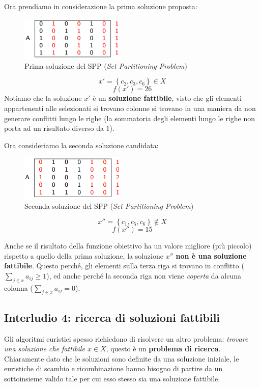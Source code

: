 \documentclass{article}
\begin{document}
Ora prendiamo in considerazione la prima soluzione proposta:

\begin{figure}[H]
    \centering
    \includegraphics[width=5cm]{images/SPP2_fst_sol.png}
    \caption{Prima soluzione del SPP (\textit{Set Partitioning Problem})}
    \label{fig:fst_sol_SPP2}
\end{figure}

$$x'=\left\{c_2,c_3,c_6\right\}\in X$$
$$f(x')=26$$
Notiamo che la soluzione $x'$ è un \textbf{soluzione fattibile}, visto che gli elementi appartenenti alle
selezionati si trovano colonne si trovano in una maniera da non generare conflitti lungo le righe (la sommatoria
degli elementi lungo le righe non porta ad un risultato diverso da $1$).

Ora consideriamo la seconda soluzione candidata:
\begin{figure}[H]
    \centering
    \includegraphics[width=5cm]{images/SPP2_snd_sol.png}
    \caption{Seconda soluzione del SPP (\textit{Set Partitioning Problem})}
    \label{fig:snd_sol_SPP2}
\end{figure}

$$x''=\left\{c_1,c_5,c_6\right\}\notin X$$
$$f(x'')=15$$

Anche se il risultato della funzione obiettivo ha un valore migliore (più piccolo) rispetto a quello della
prima soluzione, la soluzione $x''$ \textbf{non è una soluzione fattibile}. Questo perché, gli elementi sulla terza
riga si trovano in conflitto ($\sum_{j\in x}a_{ij}\geq 1$), ed anche perché la seconda riga non viene \textit{coperta}
da alcuna colonna ($\sum_{j\in x}a_{ij}=0$).

\subsection{Interludio 4: ricerca di soluzioni fattibili}
Gli algoritmi euristici spesso richiedono di risolvere un altro problema: \textit{trovare una soluzione
    che fattibile $x\in X$}, questo è un \textbf{problema di ricerca}. Chiaramente dato che le soluzioni
sono definite da una soluzione iniziale, le euristiche di scambio e ricombinazione hanno bisogno di
partire da un sottoinsieme valido tale per cui esso stesso sia una soluzione fattibile.
\end{document}
